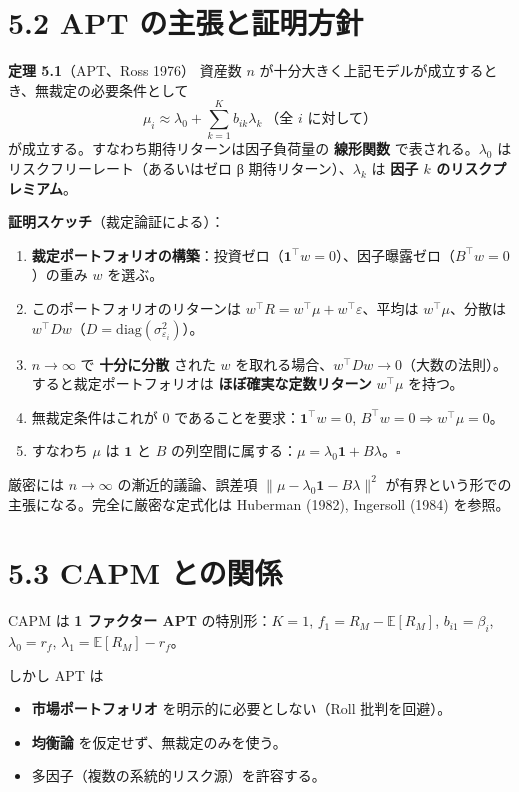 \documentclass[11pt,a4paper]{report}
\begin{document}
\section{5.2 APT の主張と証明方針}

\textbf{定理 5.1}（APT、Ross 1976） 資産数 $n$ が十分大きく上記モデルが成立するとき、無裁定の必要条件として \[ \boxed{\; \mu_i \approx \lambda_0 + \sum_{k=1}^K b_{ik} \lambda_k\ \text{（全 } i \text{ に対して）} \;} \] が成立する。すなわち期待リターンは因子負荷量の \textbf{線形関数} で表される。$\lambda_0$ はリスクフリーレート（あるいはゼロ β 期待リターン）、$\lambda_k$ は \textbf{因子 $k$ のリスクプレミアム}。

\textbf{証明スケッチ}（裁定論証による）：

\begin{enumerate}
\item \textbf{裁定ポートフォリオの構築}：投資ゼロ（$\mathbf{1}^\top w = 0$）、因子曝露ゼロ（$B^\top w = 0$）の重み $w$ を選ぶ。
\item このポートフォリオのリターンは $w^\top R = w^\top \mu + w^\top \varepsilon$、平均は $w^\top \mu$、分散は $w^\top D w$（$D = \mathrm{diag}(\sigma_{\varepsilon_i}^2)$）。
\item $n \to \infty$ で \textbf{十分に分散} された $w$ を取れる場合、$w^\top D w \to 0$（大数の法則）。すると裁定ポートフォリオは \textbf{ほぼ確実な定数リターン} $w^\top \mu$ を持つ。
\item 無裁定条件はこれが $0$ であることを要求：$\mathbf{1}^\top w = 0$, $B^\top w = 0 \Rightarrow w^\top \mu = 0$。
\item すなわち $\mu$ は $\mathbf{1}$ と $B$ の列空間に属する：$\mu = \lambda_0 \mathbf{1} + B \lambda$。$\square$
\end{enumerate}

厳密には $n \to \infty$ の漸近的議論、誤差項 $\|\mu - \lambda_0\mathbf{1} - B\lambda\|^2$ が有界という形での主張になる。完全に厳密な定式化は Huberman (1982), Ingersoll (1984) を参照。

\section{5.3 CAPM との関係}

CAPM は \textbf{1 ファクター APT} の特別形：$K = 1$, $f_1 = R_M - \mathbb{E}[R_M]$, $b_{i1} = \beta_i$, $\lambda_0 = r_f$, $\lambda_1 = \mathbb{E}[R_M] - r_f$。

しかし APT は

\begin{itemize}
\item \textbf{市場ポートフォリオ} を明示的に必要としない（Roll 批判を回避）。
\item \textbf{均衡論} を仮定せず、無裁定のみを使う。
\item 多因子（複数の系統的リスク源）を許容する。
\end{itemize}
\end{document}
